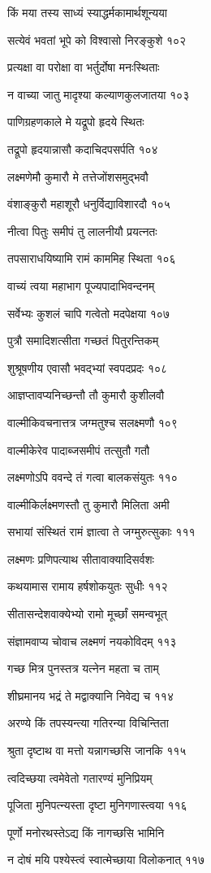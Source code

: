 किं मया तस्य साध्यं स्याद्धर्मकामार्थशून्यया

सत्येवं भवतां भूपे को विश्वासो निरङ्कुशे १०२

प्रत्यक्षा वा परोक्षा वा भर्तुर्दोषा मनःस्थिताः

न वाच्या जातु मादृश्या कल्याणकुलजातया १०३

पाणिग्रहणकाले मे यद्रूपो हृदये स्थितः

तद्रूपो हृदयान्नासौ कदाचिदपसर्पति १०४

लक्ष्मणेमौ कुमारौ मे तत्तेजोंशसमुद्भवौ

वंशाङ्कुरौ महाशूरौ धनुर्विद्याविशारदौ १०५

नीत्वा पितुः समीपं तु लालनीयौ प्रयत्नतः

तपसाराधयिष्यामि रामं काममिह स्थिता १०६

वाच्यं त्वया महाभाग पूज्यपादाभिवन्दनम्

सर्वेभ्यः कुशलं चापि गत्वेतो मदपेक्षया १०७

पुत्रौ समादिशत्सीता गच्छतं पितुरन्तिकम्

शुश्रूषणीय एवासौ भवद्भ्यां स्वपदप्रदः १०८

आज्ञप्तावप्यनिच्छन्तौ तौ कुमारौ कुशीलवौ

वाल्मीकिवचनात्तत्र जग्मतुश्च सलक्ष्मणौ १०९

वाल्मीकेरेव पादाब्जसमीपं तत्सुतौ गतौ

लक्ष्मणोऽपि ववन्दे तं गत्वा बालकसंयुतः ११०

वाल्मीकिर्लक्ष्मणस्तौ तु कुमारौ मिलिता अमी

सभायां संस्थितं रामं ज्ञात्वा ते जग्मुरुत्सुकाः १११

लक्ष्मणः प्रणिपत्याथ सीतावाक्यादिसर्वशः

कथयामास रामाय हर्षशोकयुतः सुधीः ११२

सीतासन्देशवाक्येभ्यो रामो मूर्च्छां समन्वभूत्

संज्ञामवाप्य चोवाच लक्ष्मणं नयकोविदम् ११३

गच्छ मित्र पुनस्तत्र यत्नेन महता च ताम्

शीघ्रमानय भद्रं ते मद्वाक्यानि निवेद्य च ११४

अरण्ये किं तपस्यन्त्या गतिरन्या विचिन्तिता

श्रुता दृष्टाथ वा मत्तो यन्नागच्छसि जानकि ११५

त्वदिच्छया त्वमेवेतो गतारण्यं मुनिप्रियम्

पूजिता मुनिपत्न्यस्ता दृष्टा मुनिगणास्त्वया ११६

पूर्णो मनोरथस्तेऽद्य किं नागच्छसि भामिनि

न दोषं मयि पश्येस्त्वं स्वात्मेच्छाया विलोकनात् ११७

